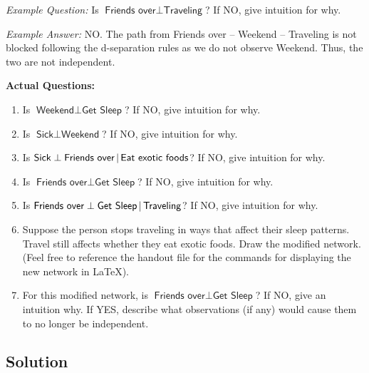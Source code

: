 \documentclass[submit]{harvardml}
\newcommand{\attr}[1]{\textsf{#1}}
\begin{document}
\begin{problem}
  \textit{Example Question:} Is $\attr{Friends over} \perp \attr{Traveling}$? If NO, give intuition for why.

  \textit{Example Answer:} NO. The path from Friends over -- Weekend -- Traveling is not blocked following the d-separation rules as we do not observe Weekend. Thus, the two are not independent. 

  \textbf{Actual Questions:}

\begin{enumerate}
\item Is $\attr{Weekend} \perp \attr{Get Sleep}$?
  If NO, give intuition for why.

\item Is $\attr{Sick} \perp \attr{Weekend}$?
  If NO, give intuition for why.


\item Is $\attr{Sick} \perp \attr{Friends over}\given \attr{Eat exotic
  foods}$? If NO, give intuition for why.


\item Is $\attr{Friends over} \perp \attr{Get Sleep}$? If NO, give
  intuition for why.

\item Is $\attr{Friends over} \perp \attr{Get Sleep} \given
  \attr{Traveling}$? If NO, give intuition for why.

\item Suppose the person stops traveling in ways that affect their
  sleep patterns.  Travel still
  affects whether they eat exotic foods.  Draw the modified network. (Feel free to reference the handout file for the commands for displaying the new network in \LaTeX).

\item For this modified network, is $\attr{Friends over} \perp
  \attr{Get Sleep}$? If NO, give an intuition why.  If YES,
  describe what observations (if any) would cause them to no longer be
  independent.

\end{enumerate}
\end{problem}

\subsection*{Solution}
\end{document}
